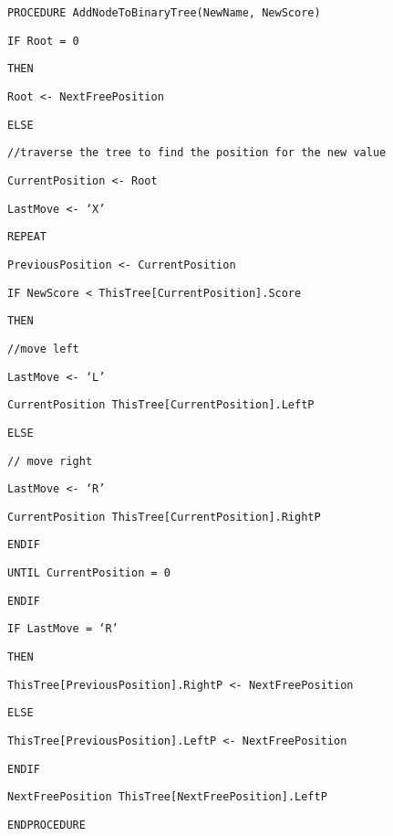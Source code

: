 \noindent %
\noindent\begin{minipage}[t]{1\columnwidth}%
\texttt{PROCEDURE AddNodeToBinaryTree(NewName, NewScore) \bigskip{}
}

\texttt{IF Root = 0 }

\texttt{\qquad{}THEN }

\texttt{\qquad{}\qquad{}Root <- NextFreePosition }

\texttt{\qquad{}ELSE }

\texttt{\qquad{}\qquad{}//traverse the tree to find the position
for the new value }

\texttt{\qquad{}\qquad{}CurrentPosition <- Root }

\texttt{\qquad{}\qquad{}LastMove <- \textquoteleft X\textquoteright{} }

\texttt{\qquad{}\qquad{}REPEAT}

\texttt{\qquad{}\qquad{}\qquad{}PreviousPosition <- CurrentPosition }

\texttt{\qquad{}\qquad{}\qquad{}IF NewScore < ThisTree{[}CurrentPosition{]}.Score }

\texttt{\qquad{}\qquad{}\qquad{}\qquad{}THEN }

\texttt{\qquad{}\qquad{}\qquad{}\qquad{}\qquad{}//move left }

\texttt{\qquad{}\qquad{}\qquad{}\qquad{}\qquad{}LastMove <- \textquoteleft L\textquoteright{} }

\texttt{\qquad{}\qquad{}\qquad{}\qquad{}\qquad{}CurrentPosition
\textleftarrow{} ThisTree{[}CurrentPosition{]}.LeftP }

\texttt{\qquad{}\qquad{}\qquad{}\qquad{}ELSE}

\texttt{\qquad{}\qquad{}\qquad{}\qquad{}\qquad{}// move right }

\texttt{\qquad{}\qquad{}\qquad{}\qquad{}\qquad{}LastMove <- \textquoteleft R\textquoteright{} }

\texttt{\qquad{}\qquad{}\qquad{}\qquad{}\qquad{}CurrentPosition
\textleftarrow{} ThisTree{[}CurrentPosition{]}.RightP }

\texttt{\qquad{}\qquad{}\qquad{}ENDIF }

\texttt{\qquad{}UNTIL CurrentPosition = 0}

\texttt{ENDIF \bigskip{}
}

\texttt{IF LastMove = \textquoteleft R\textquoteright{} }

\texttt{\qquad{}THEN }

\texttt{\qquad{}\qquad{}ThisTree{[}PreviousPosition{]}.RightP <-
NextFreePosition }

\texttt{\qquad{}ELSE }

\texttt{\qquad{}\qquad{}ThisTree{[}PreviousPosition{]}.LeftP <-
NextFreePosition}

\texttt{ENDIF }

\texttt{NextFreePosition \textleftarrow{} ThisTree{[}NextFreePosition{]}.LeftP\bigskip{}
}

\texttt{ENDPROCEDURE }%
\end{minipage}

